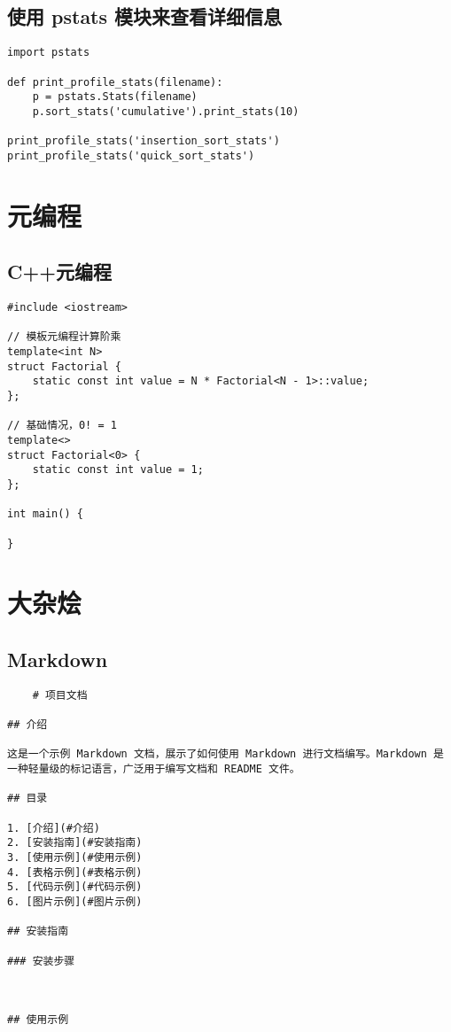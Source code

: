 \documentclass[a4paper, 12pt]{article}
\begin{document}
\subsection{使用 pstats 模块来查看详细信息}
\begin{lstlisting}
import pstats

def print_profile_stats(filename):
    p = pstats.Stats(filename)
    p.sort_stats('cumulative').print_stats(10)

print_profile_stats('insertion_sort_stats')
print_profile_stats('quick_sort_stats')
\end{lstlisting}



\newpage
\section{元编程}
\subsection{C++元编程}
\begin{lstlisting}
#include <iostream>

// 模板元编程计算阶乘
template<int N>
struct Factorial {
    static const int value = N * Factorial<N - 1>::value;
};

// 基础情况，0! = 1
template<>
struct Factorial<0> {
    static const int value = 1;
};

int main() {

}

\end{lstlisting}





\section{大杂烩}
\subsection{Markdown}
\begin{lstlisting}
    # 项目文档

## 介绍

这是一个示例 Markdown 文档，展示了如何使用 Markdown 进行文档编写。Markdown 是一种轻量级的标记语言，广泛用于编写文档和 README 文件。

## 目录

1. [介绍](#介绍)
2. [安装指南](#安装指南)
3. [使用示例](#使用示例)
4. [表格示例](#表格示例)
5. [代码示例](#代码示例)
6. [图片示例](#图片示例)

## 安装指南

### 安装步骤



## 使用示例


\end{lstlisting}
\end{document}
